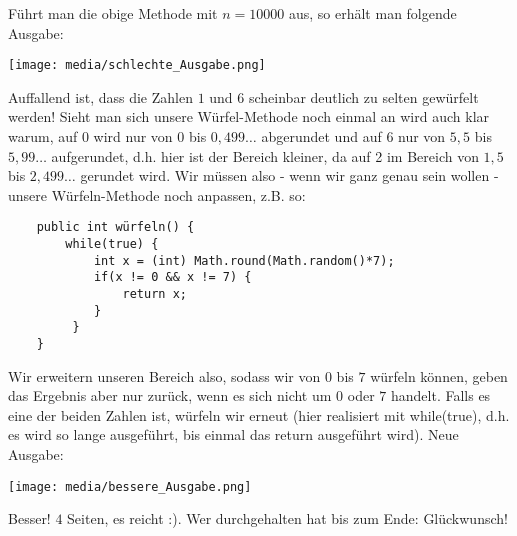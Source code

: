 \documentclass{article}
\begin{document}
Führt man die obige Methode mit $n=10000$ aus, so erhält man folgende Ausgabe:
\begin{center}
    \texttt{[image: media/schlechte\_Ausgabe.png]}
\end{center}
Auffallend ist, dass die Zahlen $1$ und $6$ scheinbar deutlich zu selten gewürfelt werden! Sieht man sich unsere Würfel-Methode noch einmal an wird auch klar warum, auf $0$ wird nur von $0$ bis $0,499\dots$ abgerundet und auf $6$ nur von $5,5$ bis $5,99\dots$ aufgerundet, d.h. hier ist der Bereich kleiner, da auf 2 im Bereich von $1,5$ bis $2,499\dots$ gerundet wird. Wir müssen also - wenn wir ganz genau sein wollen - unsere Würfeln-Methode noch anpassen, z.B. so:
\begin{verbatim}
    public int würfeln() {
        while(true) {
            int x = (int) Math.round(Math.random()*7);
            if(x != 0 && x != 7) {
                return x;
            }
         }
    }
\end{verbatim}
Wir erweitern unseren Bereich also, sodass wir von $0$ bis $7$ würfeln können, geben das Ergebnis aber nur zurück, wenn es sich nicht um $0$ oder $7$ handelt. Falls es eine der beiden Zahlen ist, würfeln wir erneut (hier realisiert mit while(true), d.h. es wird so lange ausgeführt, bis einmal das return ausgeführt wird). Neue Ausgabe:
\begin{center}
    \texttt{[image: media/bessere\_Ausgabe.png]}
\end{center}
Besser! $4$ Seiten, es reicht :). Wer durchgehalten hat bis zum Ende: Glückwunsch!
\end{document}
